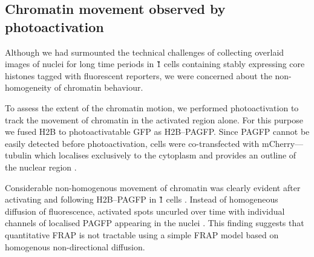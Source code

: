 

    \subsection{Chromatin movement observed by photoactivation}

    Although we had surmounted the technical challenges of collecting
    overlaid images of nuclei for long time periods
    in \G1{} cells containing stably expressing
    core histones tagged with fluorescent reporters,
    we were concerned about the non-homogeneity of chromatin behaviour.

    To assess the extent of the chromatin motion,
    we performed photoactivation
    to track the movement of chromatin in the activated region alone.
    For this purpose we fused H2B to photoactivatable GFP as H2B--PAGFP.
    Since PAGFP cannot be easily detected before photoactivation,
    cells were co-transfected with mCherry--\textalpha--tubulin
    which localises exclusively to the cytoplasm
    and provides an outline of the nuclear region
    .

    Considerable non-homogenous movement of chromatin was clearly evident
    after activating and following H2B--PAGFP in
    \G1{} cells .
    Instead of homogeneous diffusion of fluorescence,
    activated spots uncurled over time with individual channels of
    localised PAGFP appearing in the nuclei .
    This finding suggests that quantitative FRAP is not tractable using
    a simple FRAP model based on homogenous non-directional diffusion.

